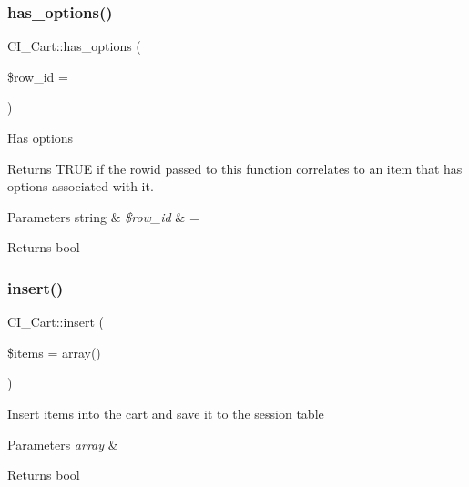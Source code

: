 \subsubsection{\texorpdfstring{has\+\_\+options()}{has\_options()}}
{\footnotesize\ttfamily C\+I\+\_\+\+Cart\+::has\+\_\+options (\begin{DoxyParamCaption}\item[{}]{\$row\+\_\+id = {\ttfamily \textquotesingle{}\textquotesingle{}} }\end{DoxyParamCaption})}

Has options

Returns T\+R\+UE if the rowid passed to this function correlates to an item that has options associated with it.


\begin{DoxyParams}[1]{Parameters}
string & {\em \$row\+\_\+id} & = \textquotesingle{}\textquotesingle{} \\
\hline
\end{DoxyParams}
\begin{DoxyReturn}{Returns}
bool 
\end{DoxyReturn}
\mbox{\label{class_c_i___cart_aa7dd4b1bdf5f75195d6c6d9525513057}} 
\subsubsection{\texorpdfstring{insert()}{insert()}}
{\footnotesize\ttfamily C\+I\+\_\+\+Cart\+::insert (\begin{DoxyParamCaption}\item[{}]{\$items = {\ttfamily array()} }\end{DoxyParamCaption})}

Insert items into the cart and save it to the session table


\begin{DoxyParams}{Parameters}
{\em array} & \\
\hline
\end{DoxyParams}
\begin{DoxyReturn}{Returns}
bool 
\end{DoxyReturn}
\mbox{\label{class_c_i___cart_ac15deabee56211701de5d6ae53ea4155}} 

